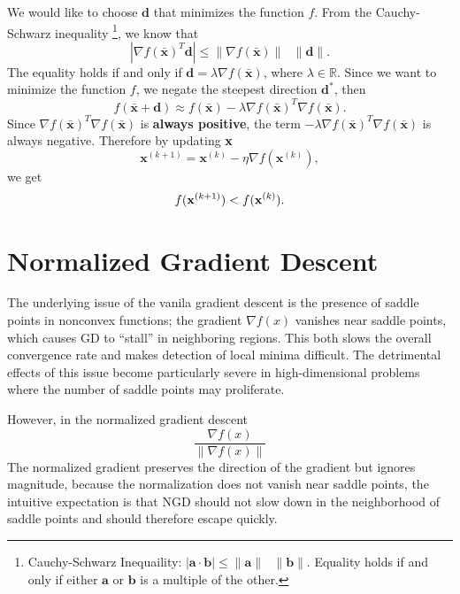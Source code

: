 We would like to choose $\mathbf{d}$ that minimizes the function $f$. From the Cauchy-Schwarz inequality \footnote{Cauchy-Schwarz Inequaility: $|\mathbf{a}\cdot \mathbf{b}|\leq \|\mathbf{a}\|\textrm{ } \|\mathbf{b}\|$. Equality holds if and only if either $\mathbf{a}$ or $\mathbf{b}$ is a multiple of the other.}, we know that
$$|\nabla f(\bar{\mathbf{x}})^T\mathbf{d}|\leq \|\nabla f(\bar{\mathbf{x}})\|\textrm{ }\|\mathbf{d}\|.$$
The equality holds if and only if $\mathbf{d}=\lambda \nabla f(\bar{\mathbf{x}})$, where $\lambda\in \mathbb{R}$. Since we want to minimize the function $f$, we negate the steepest direction $\mathbf{d}^{*}$, then 
$$f(\bar{\mathbf{x}}+\mathbf{d})\approx f(\bar{\mathbf{x}})-\lambda\nabla f(\bar{\mathbf{x}})^T\nabla f(\bar{\mathbf{x}}).$$
Since $\nabla f(\bar{\mathbf{x}})^T\nabla f(\bar{\mathbf{x}})$ is \textbf{always positive}, the term $-\lambda\nabla f(\bar{\mathbf{x}})^T\nabla f(\bar{\mathbf{x}})$ is always negative. Therefore by updating ${\mathbf{x}}$
$$\mathbf{x}^{(k+1)} = \mathbf{x}^{(k)} - \eta \nabla f(\mathbf{x}^{(k)}),$$
we get
$$f({\mathbf{x}}^{(k+1)}) < f({\mathbf{x}}^{(k)}).$$



\section{Normalized Gradient Descent}

The underlying issue of the vanila gradient descent is the presence of saddle points in nonconvex functions; the gradient $\nabla f(x)$ vanishes near saddle points, which causes GD to ``stall'' in neighboring regions. This both slows the overall convergence rate and makes detection of local minima difficult. The detrimental effects of this issue become particularly severe in high-dimensional problems where the number of saddle points may proliferate.


However, in the normalized gradient descent
$$ \frac{\nabla f(x)}{\|\nabla f(x)\|}$$
The normalized gradient preserves the direction of the gradient but ignores magnitude, because the normalization does not vanish near saddle points, the intuitive expectation is that NGD should not slow down in the neighborhood of saddle points and should therefore escape quickly. 

